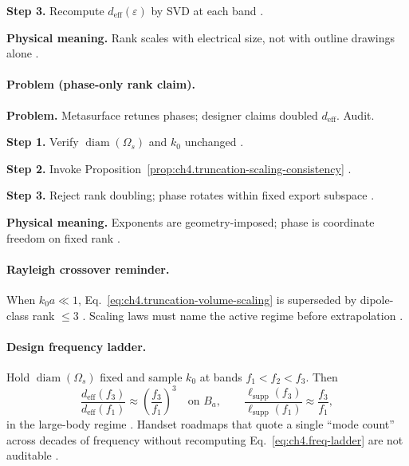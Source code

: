\textbf{Step 3.} Recompute \(d_{\mathrm{eff}}(\varepsilon)\) by SVD at each band \cite{devaney2004}.

\textbf{Physical meaning.} Rank scales with electrical size, not with outline drawings alone \cite{stratton1941}.

\paragraph{Problem (phase-only rank claim).}
\textbf{Problem.} Metasurface retunes phases; designer claims doubled \(d_{\mathrm{eff}}\). Audit.

\textbf{Step 1.} Verify \(\operatorname{diam}(\Omega_{s})\) and \(k_{0}\) unchanged \cite{stratton1941,harrington2001}.

\textbf{Step 2.} Invoke Proposition~\ref{prop:ch4.truncation-scaling-consistency} \cite{hansen1988,devaney2004}.

\textbf{Step 3.} Reject rank doubling; phase rotates within fixed export subspace \cite{harrington2001}.

\textbf{Physical meaning.} Exponents are geometry-imposed; phase is coordinate freedom on fixed rank \cite{stratton1941}.

\paragraph{Rayleigh crossover reminder.}
When \(k_{0}a\ll1\), Eq.~\eqref{eq:ch4.truncation-volume-scaling} is superseded by dipole-class rank \(\le3\) \cite{jackson1999,hansen1988}.
Scaling laws must name the active regime before extrapolation \cite{stratton1941,harrington2001}.

\paragraph{Design frequency ladder.}
Hold \(\operatorname{diam}(\Omega_{s})\) fixed and sample \(k_{0}\) at bands \(f_{1}<f_{2}<f_{3}\). Then
\begin{equation}
\label{eq:ch4.freq-ladder}
\frac{d_{\mathrm{eff}}(f_{3})}{d_{\mathrm{eff}}(f_{1})}
\approx
\left(\frac{f_{3}}{f_{1}}\right)^{3}
\quad\text{on }B_{a},\qquad
\frac{\ell_{\mathrm{supp}}(f_{3})}{\ell_{\mathrm{supp}}(f_{1})}
\approx
\frac{f_{3}}{f_{1}},
\end{equation}
in the large-body regime \cite{jackson1999,hansen1988,harrington2001}. Handset roadmaps that quote a single ``mode count'' across decades of
frequency without recomputing Eq.~\eqref{eq:ch4.freq-ladder} are not auditable \cite{stratton1941,devaney2004,collin2001}.

